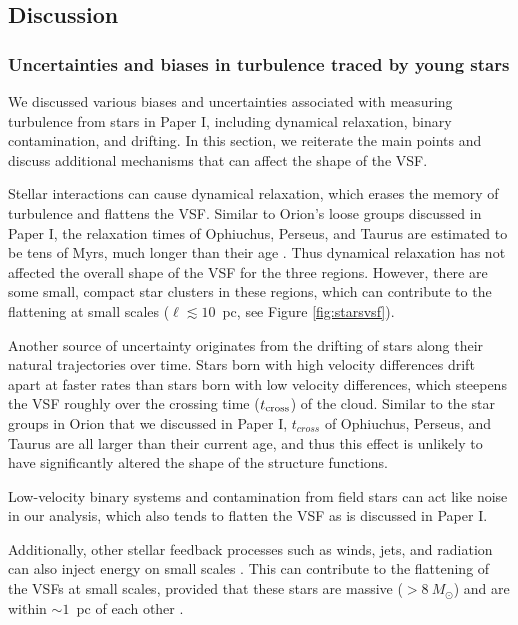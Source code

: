 \subsection{Discussion} \label{sec:multi-region-discussion}

\subsubsection{Uncertainties and biases in turbulence traced by young stars} \label{sec:star_discussion}

We discussed various biases and uncertainties associated with measuring turbulence from stars in Paper I, including dynamical relaxation, binary contamination, and drifting. In this section, we reiterate the main points and discuss additional mechanisms that can affect the shape of the VSF.

Stellar interactions can cause dynamical relaxation, which erases the memory of turbulence and flattens the VSF\@. Similar to Orion's loose groups discussed in Paper I, the relaxation times of Ophiuchus, Perseus, and Taurus are estimated to be tens of Myrs, much longer than their age \citep[for a detailed discussion of the age of each region, see][]{wilking_star_2008,krolikowski_gaia_2021,pavlidou_substructure_2021}. Thus dynamical relaxation has not affected the overall shape of the VSF for the three regions. However, there are some small, compact star clusters in these regions, which can contribute to the flattening at small scales ($\ell \lesssim 10$~pc, see Figure \ref{fig:starsvsf}).

Another source of uncertainty originates from the drifting of stars along their natural trajectories over time. Stars born with high velocity differences drift apart at faster rates than stars born with low velocity differences, which steepens the VSF roughly over the crossing time ($t_{\rm cross}$) of the cloud. Similar to the star groups in Orion that we discussed in Paper I, $t_{cross}$ of Ophiuchus, Perseus, and Taurus are all larger than their current age, and thus this effect is unlikely to have significantly altered the shape of the structure functions.

Low-velocity binary systems and contamination from field stars can act like noise in our analysis, which also tends to flatten the VSF as is discussed in Paper I.

Additionally, other stellar feedback processes such as winds, jets, and radiation can also inject energy on small scales \citep[e.g.,][]{gritschneder_driving_2009, offner_impact_2015, li_disruption_2019, rosen_blowing_2021, grudic_dynamics_2022}. This can contribute to the flattening of the VSFs at small scales, provided that these stars are massive ($> 8~M_{\odot}$) and are within $\sim 1$~pc of each other \citep[][]{rosen_blowing_2021}. 

